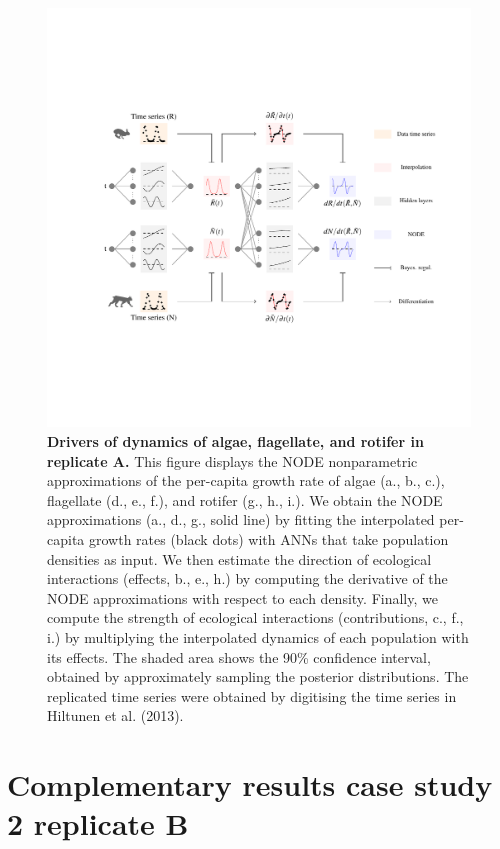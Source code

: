 \documentclass[11pt, oneside]{article}
\begin{document}
\newpage
\begin{figure}[H]
\includegraphics[width=1\linewidth,page=9]{figures/main.pdf}
\caption{
    \textbf{Drivers of dynamics of algae, flagellate, and rotifer in replicate A.}
    This figure displays the NODE nonparametric approximations of the per-capita growth rate of algae (a., b., c.), flagellate (d., e., f.), and rotifer (g., h., i.).
    We obtain the NODE approximations (a., d., g., solid line) by fitting the interpolated per-capita growth rates (black dots) with ANNs that take population densities as input.
    We then estimate the direction of ecological interactions (effects, b., e., h.) by computing the derivative of the NODE approximations with respect to each density.
    Finally, we compute the strength of ecological interactions (contributions, c., f., i.) by multiplying the interpolated dynamics of each population with its effects.
    The shaded area shows the 90\% confidence interval, obtained by approximately sampling the posterior distributions. 
    The replicated time series were obtained by digitising the time series in Hiltunen et al. (2013).
}
\end{figure}
\newpage

\section{Complementary results case study 2 replicate B}
\end{document}
